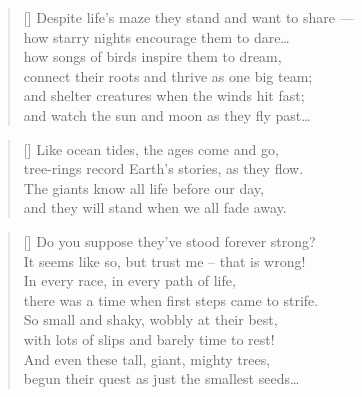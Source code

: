 \begin{verse}[\versewidth]
	Despite life's maze they stand and want to share ---\\
	how starry nights encourage them to dare\ldots\\
	how songs of birds inspire them to dream,\\
	connect their roots and thrive as one big team;\\
	and shelter creatures when the winds hit fast;\\
	and watch the sun and moon as they fly past\ldots
\end{verse}

\begin{verse}[\versewidth]
	Like ocean tides, the ages come and go,\\
	tree-rings record Earth's stories, as they flow.\\
	The giants know all life before our day,\\
	and they will stand when we all fade away.
\end{verse}

\begin{verse}[\versewidth]
	Do you suppose they've stood forever strong?\\
	It seems like so, but trust me -- that is wrong!\\
	In every race, in every path of life,\\
	there was a time when first steps came to strife.\\
	So small and shaky, wobbly at their best,\\
	with lots of slips and barely time to rest!\\
	And even these tall, giant, mighty trees,\\
	begun their quest as just the smallest seeds\ldots
\end{verse}